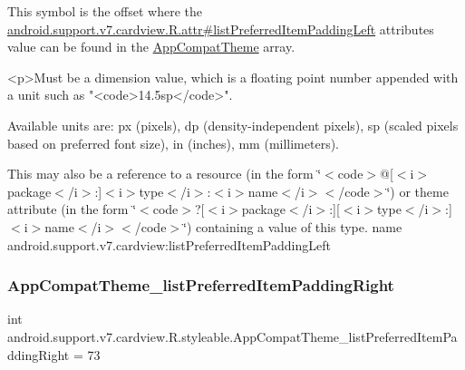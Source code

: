 This symbol is the offset where the \hyperlink{classandroid_1_1support_1_1v7_1_1cardview_1_1R_1_1attr_a7bc3c12c42966b895676e5dae546ee29}{android.\+support.\+v7.\+cardview.\+R.\+attr\#list\+Preferred\+Item\+Padding\+Left} attribute\textquotesingle{}s value can be found in the \hyperlink{classandroid_1_1support_1_1v7_1_1cardview_1_1R_1_1styleable_a52e6f69f954ecc2622d72c0b4d298938}{App\+Compat\+Theme} array.

\begin{DoxyVerb}      <p>Must be a dimension value, which is a floating point number appended with a unit such as "<code>14.5sp</code>".
\end{DoxyVerb}
 Available units are\+: px (pixels), dp (density-\/independent pixels), sp (scaled pixels based on preferred font size), in (inches), mm (millimeters). 

This may also be a reference to a resource (in the form \char`\"{}$<$code$>$@\mbox{[}$<$i$>$package$<$/i$>$\+:\mbox{]}$<$i$>$type$<$/i$>$\+:$<$i$>$name$<$/i$>$$<$/code$>$\char`\"{}) or theme attribute (in the form \char`\"{}$<$code$>$?\mbox{[}$<$i$>$package$<$/i$>$\+:\mbox{]}\mbox{[}$<$i$>$type$<$/i$>$\+:\mbox{]}$<$i$>$name$<$/i$>$$<$/code$>$\char`\"{}) containing a value of this type.  name android.\+support.\+v7.\+cardview\+:list\+Preferred\+Item\+Padding\+Left \mbox{\label{classandroid_1_1support_1_1v7_1_1cardview_1_1R_1_1styleable_a12084f5e81db166fdb702be49115eaf3}} 
\subsubsection{\texorpdfstring{App\+Compat\+Theme\+\_\+list\+Preferred\+Item\+Padding\+Right}{AppCompatTheme\_listPreferredItemPaddingRight}}
{\footnotesize\ttfamily int android.\+support.\+v7.\+cardview.\+R.\+styleable.\+App\+Compat\+Theme\+\_\+list\+Preferred\+Item\+Padding\+Right = 73\hspace{0.3cm}{\ttfamily [static]}}

